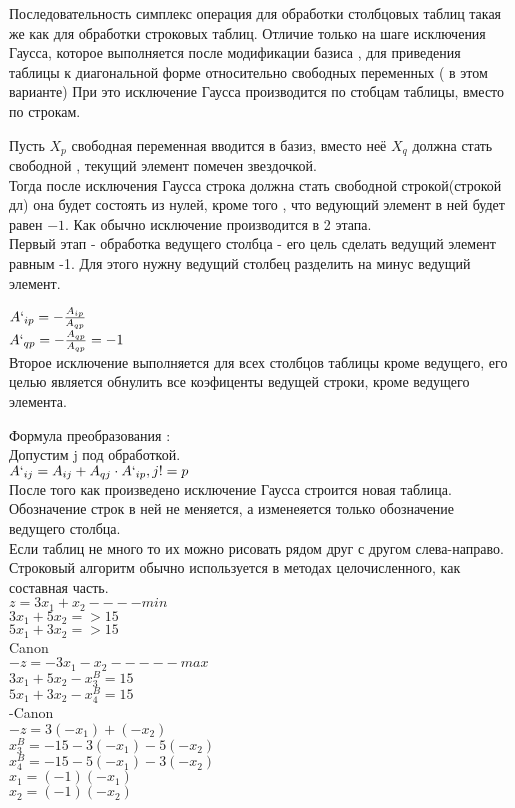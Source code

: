 Последовательность симплекс операция для обработки столбцовых таблиц такая же как для обработки строковых таблиц.
Отличие только на шаге исключения Гаусса, которое выполняется после модификации базиса ,
для приведения таблицы к диагональной форме относительно свободных переменных ( в этом варианте)
При это исключение Гаусса производится по стобцам таблицы, вместо по строкам.

Пусть $X_p$ свободная переменная вводится в базиз, вместо неё $X_q$ должна стать свободной , текущий элемент помечен звездочкой.\\
Тогда после исключения Гаусса строка должна стать свободной строкой(строкой дл) она будет состоять из нулей,
кроме того , что ведующий элемент в ней будет равен $-1$.
Как обычно исключение производится в 2 этапа.\\
Первый этап - обработка ведущего столбца - его цель сделать ведущий элемент равным -1.
Для этого нужну ведущий столбец разделить на минус ведущий элемент.

$A`_{ip} =  - \frac{A_{ip}}{A_{qp}}$\\

$A`_{qp} =  - \frac{A_{qp}}{A_{qp}} = -1$\\

Второе исключение выполняется для всех столбцов таблицы кроме ведущего,
его целью является обнулить все коэфиценты ведущей строки, кроме ведущего элемента.

Формула преобразования :\\
Допустим j под обработкой.\\
$A`_{ij} = A_{ij} + A_{qj} \cdot A`_{ip} , j != p  $\\

После того как произведено исключение Гаусса строится новая таблица. Обозначение строк в ней не меняется,
а изменеяется только обозначение ведущего столбца.\\
Если таблиц не много то их можно рисовать рядом друг с другом слева-направо. \\

Строковый алгоритм обычно используется в методах целочисленного, как составная часть.\\
$z  = 3x_1  + x_2 ----min $\\
$3x_1 + 5x_2 => 15 $ \\
$5x_1 + 3x_2 =>15 $\\
Canon\\
$ -z = -3x_1 - x_2 -----max $\\
$3x_1 + 5x_2 - x_3^B = 15 $\\
$5x_1 + 3x_2 -x_4^B = 15  $ \\
-Canon \\
$ -z = 3 (-x_1)  +(-x_2)  $\\
$ x_3^B = -15  - 3(-x_1) - 5(-x_2) $\\
$ x_4^B = -15 - 5(-x_1) - 3(-x_2)$\\

$x_1 = (-1)(-x_1) $\\
$x_2 = (-1)(-x_2) $\\



